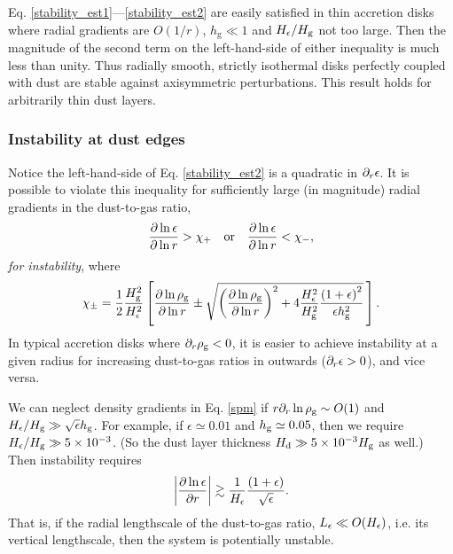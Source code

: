 Eq. \ref{stability_est1}---\ref{stability_est2} are easily satisfied
in thin accretion disks where radial gradients are $O(1/r)$, 
$h_\mathrm{g}\ll 1$ and $H_\epsilon/H_\mathrm{g}$ not too
large.  Then the
magnitude of the second term on the left-hand-side  of either
inequality is much less than unity. Thus radially smooth, strictly
isothermal disks perfectly coupled with dust are stable against
axisymmetric perturbations. This result holds for arbitrarily thin
dust layers. 


\subsubsection{Instability at dust edges}
Notice the left-hand-side of Eq. \ref{stability_est2} is a quadratic in
$\partial_r\epsilon$. It is possible to
violate this inequality for sufficiently large (in magnitude) radial
gradients  in the dust-to-gas ratio, 
\begin{align}
  \frac{\partial\ln{\epsilon}}{\partial\ln{r}} > \chi_+ \quad \mathrm{or} \quad 
  \frac{\partial\ln{\epsilon}}{\partial\ln{r}} < \chi_-,
\end{align}
\emph{for instability}, where
\begin{align}\label{spm}
\chi_\pm = \frac{1}{2}\frac{H_\mathrm{g}^2}{H_\epsilon^2} 
  \left[
  \frac{\partial\ln{\rho_\mathrm{g}}}{\partial\ln{r}} \pm 
  \sqrt{
  \left(\frac{\partial\ln{\rho_\mathrm{g}}}{\partial\ln{r}}\right)^2 + 
  4 \frac{H_\epsilon^2}{H_\mathrm{g}^2}
  \frac{\left(1+\epsilon\right)^2}{\epsilon h_\mathrm{g}^2}
  }
  \,\right]. 
\end{align} 
In typical accretion disks where $\partial_r\rho_\mathrm{g}<0$, it is easier to
achieve instability at a given radius for increasing dust-to-gas
ratios in outwards ($\partial_r\epsilon > 0$), and vice versa.  

We can neglect density gradients in Eq. \ref{spm} 
if $r\partial_r\ln{\rho_\mathrm{g}}\sim O(1)$ and $H_\epsilon/H_\mathrm{g}\gg
\sqrt{\epsilon}h_\mathrm{g}$. For example, if $\epsilon\simeq 0.01$ and
$h_\mathrm{g}\simeq 0.05$, then we require $H_\epsilon/H_\mathrm{g}\gg
5\times10^{-3}$. (So the dust layer thickness $H_\mathrm{d}\gg 5
\times10^{-3}H_\mathrm{g}$ as well.) Then 
instability requires 
\begin{align}\label{dust_edge}
\left|\frac{\partial\ln{\epsilon}}{\partial r}\right| \gtrsim
  \frac{1}{H_\epsilon}\frac{\left(1+\epsilon\right)}{\sqrt{\epsilon}}.
\end{align}
That is, if the radial lengthscale of the dust-to-gas ratio,
$L_\epsilon\ll O(H_\epsilon)$, i.e. its vertical lengthscale,  
then the system is potentially unstable.  

